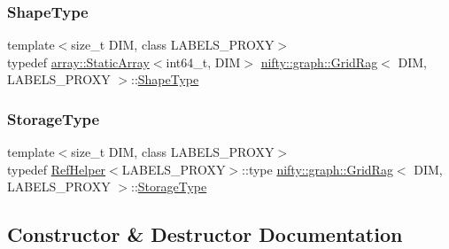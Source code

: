 \subsubsection{\texorpdfstring{Shape\+Type}{ShapeType}}
{\footnotesize\ttfamily template$<$size\+\_\+t D\+IM, class L\+A\+B\+E\+L\+S\+\_\+\+P\+R\+O\+XY$>$ \\
typedef \hyperlink{namespacenifty_1_1array_a683f151f19c851754e0c6d55ed16a0c2}{array\+::\+Static\+Array}$<$int64\+\_\+t, D\+IM$>$ \hyperlink{classnifty_1_1graph_1_1GridRag}{nifty\+::graph\+::\+Grid\+Rag}$<$ D\+IM, L\+A\+B\+E\+L\+S\+\_\+\+P\+R\+O\+XY $>$\+::\hyperlink{classnifty_1_1graph_1_1GridRag_a3693e007e1419dec9751cca751a1061d}{Shape\+Type}}

\mbox{\label{classnifty_1_1graph_1_1GridRag_ae7dcf657b20ef49d062648978e192cdb}} 
\subsubsection{\texorpdfstring{Storage\+Type}{StorageType}}
{\footnotesize\ttfamily template$<$size\+\_\+t D\+IM, class L\+A\+B\+E\+L\+S\+\_\+\+P\+R\+O\+XY$>$ \\
typedef \hyperlink{structnifty_1_1graph_1_1RefHelper}{Ref\+Helper}$<$L\+A\+B\+E\+L\+S\+\_\+\+P\+R\+O\+XY$>$\+::type \hyperlink{classnifty_1_1graph_1_1GridRag}{nifty\+::graph\+::\+Grid\+Rag}$<$ D\+IM, L\+A\+B\+E\+L\+S\+\_\+\+P\+R\+O\+XY $>$\+::\hyperlink{classnifty_1_1graph_1_1GridRag_ae7dcf657b20ef49d062648978e192cdb}{Storage\+Type}\hspace{0.3cm}{\ttfamily [protected]}}



\subsection{Constructor \& Destructor Documentation}
\mbox{\label{classnifty_1_1graph_1_1GridRag_a68da171354688c46cbb33d953e7ba267}} 

